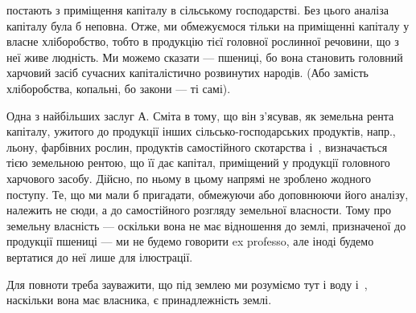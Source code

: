 \parcont{}  %
постають з приміщення капіталу в сільському господарстві. Без цього аналіза
капіталу була б неповна. Отже, ми обмежуємося тільки на приміщенні капіталу
у власне хліборобство, тобто в продукцію тієї головної рослинної речовини, що
з неї живе людність. Ми можемо сказати — пшениці, бо вона становить головний
харчовий засіб сучасних капіталістично розвинутих народів. (Або замість
хліборобства, копальні, бо закони — ті самі).

Одна з найбільших заслуг А. Сміта в тому, що він з’ясував, як земельна
рента капіталу, ужитого до продукції інших сільсько-господарських продуктів,
напр., льону, фарбівних рослин, продуктів самостійного скотарства і~, визначається
тією земельною рентою, що її дає капітал, приміщений у продукції
головного харчового засобу. Дійсно, по ньому в цьому напрямі не зроблено жодного
поступу. Те, що ми мали б пригадати, обмежуючи або доповнюючи його
аналізу, належить не сюди, а до самостійного розгляду земельної власности.
Тому про земельну власність — оскільки вона не має відношення до землі, призначеної
до продукції пшениці — ми не будемо говорити ex professo, але іноді
будемо вертатися до неї лише для ілюстрації.

Для повноти треба зауважити, що під землею ми розуміємо тут і воду і~,
наскільки вона має власника, є принадлежність землі.

